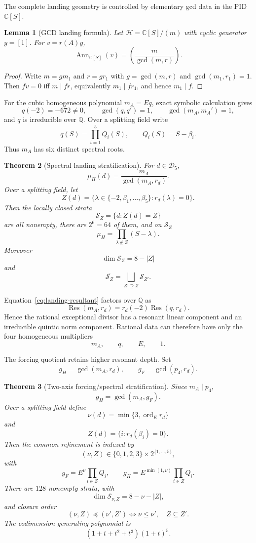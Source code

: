 \documentclass[11pt]{amsart}
\newtheorem{theorem}{Theorem}[section]
\newtheorem{lemma}[theorem]{Lemma}
\newcommand{\C}{\mathbb C}
\newcommand{\Q}{\mathbb Q}
\begin{document}
The complete landing geometry is controlled by elementary gcd data in the PID $\C[S]$.

\begin{lemma}[GCD landing formula]\label{lem:gcd-landing}
Let $\mathcal H=\C[S]/(m)$ with cyclic generator $y=[1]$.  For $v=r(A)y$,
\[
\boxed{
\operatorname{Ann}_{\C[S]}(v)=\left(\frac{m}{\gcd(m,r)}\right).
}
\]
\end{lemma}

\begin{proof}
Write $m=gm_1$ and $r=gr_1$ with $g=\gcd(m,r)$ and $\gcd(m_1,r_1)=1$.  Then $fv=0$ iff $m\mid fr$, equivalently $m_1\mid fr_1$, and hence $m_1\mid f$.
\end{proof}

For the cubic homogeneous polynomial $m_A=Eq$, exact symbolic calculation gives
\[
q(-2)=-672\neq0,
\qquad
\gcd(q,q')=1,
\qquad
\gcd(m_A,m_A')=1,
\]
and $q$ is irreducible over $\Q$.  Over a splitting field write
\[
q(S)=\prod_{i=1}^5Q_i(S),
\qquad
Q_i(S)=S-\beta_i.
\]
Thus $m_A$ has six distinct spectral roots.

\begin{theorem}[Spectral landing stratification]\label{thm:spectral-stratification}
For $d\in\mathscr D_5$,
\[
\boxed{
\mu_H(d)=\frac{m_A}{\gcd(m_A,r_d)}.
}
\]
Over a splitting field, let
\[
Z(d)=\{\lambda\in\{-2,\beta_1,\ldots,\beta_5\}:r_d(\lambda)=0\}.
\]
Then the locally closed strata
\[
\mathscr S_Z=\{d:Z(d)=Z\}
\]
are all nonempty, there are $2^6=64$ of them, and on $\mathscr S_Z$
\[
\boxed{
\mu_H=\prod_{\lambda\notin Z}(S-\lambda).
}
\]
Moreover
\[
\dim\mathscr S_Z=8-|Z|
\]
and
\[
\overline{\mathscr S_Z}
=\bigsqcup_{Z'\supseteq Z}\mathscr S_{Z'}.
\]
\end{theorem}

Equation~\eqref{eq:landing-resultant} factors over $\Q$ as
\[
\operatorname{Res}(m_A,r_d)
=r_d(-2)\operatorname{Res}(q,r_d).
\]
Hence the rational exceptional divisor has a resonant linear component and an irreducible quintic norm component.  Rational data can therefore have only the four homogeneous multipliers
\[
m_A,
\qquad q,
\qquad E,
\qquad1.
\]

The forcing quotient retains higher resonant depth.  Set
\[
g_H=\gcd(m_A,r_d),
\qquad
g_F=\gcd(p_4,r_d).
\]

\begin{theorem}[Two-axis forcing/spectral stratification]\label{thm:two-axis}
Since $m_A\mid p_4$,
\[
\boxed{g_H=\gcd(m_A,g_F).}
\]
Over a splitting field define
\[
\nu(d)=\min\{3,\operatorname{ord}_{E}r_d\}
\]
and
\[
Z(d)=\{i:r_d(\beta_i)=0\}.
\]
Then the common refinement is indexed by
\[
(\nu,Z)\in\{0,1,2,3\}\times2^{\{1,\ldots,5\}},
\]
with
\[
\boxed{
g_F=E^\nu\prod_{i\in Z}Q_i,
\qquad
g_H=E^{\min(1,\nu)}\prod_{i\in Z}Q_i.
}
\]
There are $128$ nonempty strata, with
\[
\dim\mathscr S_{\nu,Z}=8-\nu-|Z|,
\]
and closure order
\[
(\nu,Z)\preceq(\nu',Z')
\iff
\nu\le\nu',\quad Z\subseteq Z'.
\]
The codimension generating polynomial is
\[
(1+t+t^2+t^3)(1+t)^5.
\]
\end{theorem}
\end{document}
